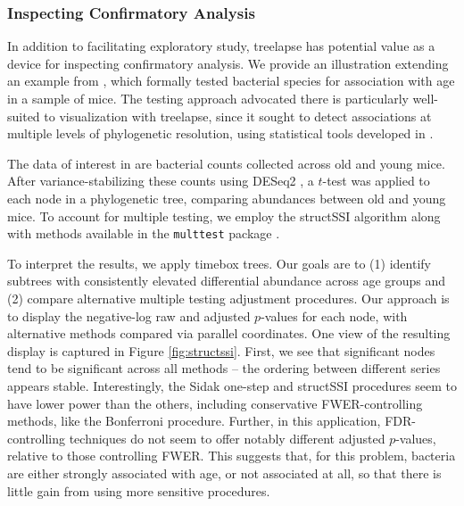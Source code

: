 \documentclass[12pt]{article}
\begin{document}
\subsubsection*{Inspecting Confirmatory Analysis}\label{structssi}

In addition to facilitating exploratory study, treelapse has potential
value as a device for inspecting confirmatory analysis. We provide an
illustration extending an example from \citep{callahan2016bioconductor}, which
formally tested bacterial species for association with age in a sample of mice.
The testing approach advocated there is particularly well-suited to
visualization with treelapse, since it sought to detect associations at multiple
levels of phylogenetic resolution, using statistical tools developed in
\citep{yekutieli2008hierarchical, sankaran2014structssi}.

The data of interest in \citep{callahan2016bioconductor} are bacterial counts
collected across old and young mice. After variance-stabilizing these counts
using DESeq2 \citep{love2014moderated}, a $t$-test was
applied to each node in a phylogenetic tree, comparing abundances
between old and young mice. To account for multiple testing, we employ
the structSSI algorithm \citep{yekutieli2008hierarchical, sankaran2014structssi}
along with methods available in the \texttt{multtest} package
\citep{pollard2005multiple}.

To interpret the results, we apply timebox trees. Our goals are to (1)
identify subtrees with consistently elevated differential abundance
across age groups and (2) compare alternative multiple testing
adjustment procedures. Our approach is to display the negative-log raw
and adjusted $p$-values for each node, with alternative methods
compared via parallel coordinates. One view of the resulting display is
captured in Figure \ref{fig:structssi}. First, we see that significant
nodes tend to be significant across all methods -- the ordering between
different series appears stable. Interestingly, the Sidak one-step and
structSSI procedures seem to have lower power than the others, including
conservative FWER-controlling methods, like the Bonferroni procedure.
Further, in this application, FDR-controlling techniques do not seem to
offer notably different adjusted $p$-values, relative to those
controlling FWER. This suggests that, for this problem, bacteria are
either strongly associated with age, or not associated at all, so that
there is little gain from using more sensitive procedures.
\end{document}
